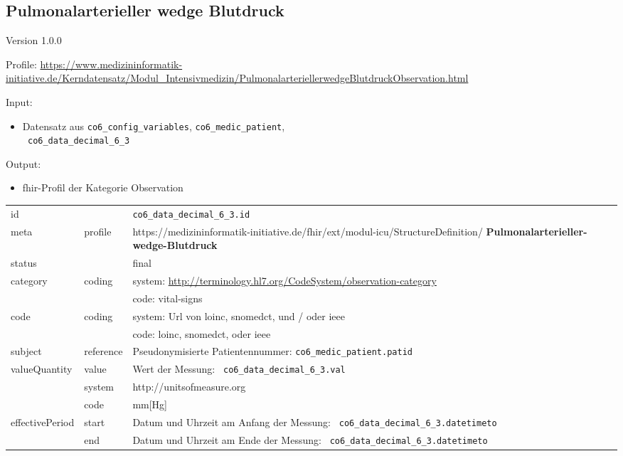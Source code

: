 \subsection{
Pulmonalarterieller wedge Blutdruck} 
\noindent Version 1.0.0

\noindent Profile: \url{https://www.medizininformatik-initiative.de/Kerndatensatz/Modul_Intensivmedizin/PulmonalarteriellerwedgeBlutdruckObservation.html}

\noindent Input:
\begin{itemize}
	\item Datensatz aus \texttt{co6\_config\_variables}, \texttt{co6\_medic\_patient}, \\ \texttt{
co6\_data\_decimal\_6\_3}
\end{itemize}
Output:
\begin{itemize}
        \item \ac{fhir}-Profil der Kategorie \glqq Observation\grqq{}
\end{itemize}
\begin{longtable}{|l|l|p{7.5cm}|}
        \hline
        \rowcolor{lightgray} \multicolumn{3}{|l|}{Data Mapping (inhaltlich)} \\ \hline
        id &  & \texttt{co6\_data\_decimal\_6\_3.id} \\ \hline
	meta & profile & https://medizininformatik-initiative.de/fhir/ext/modul-icu/StructureDefinition/\textbf{
Pulmonalarterieller-wedge-Blutdruck} \\ \hline 
	status &  & final  \\ \hline 
	category & coding & system: \url{http://terminology.hl7.org/CodeSystem/observation-category} \\
\cline{3-3}
	& & code: vital-signs\\ \hline
	code & coding & system: Url von \ac{loinc}, \ac{snomedct}, und / oder \ac{ieee} \\ 
	\cline{3-3} 
	 &  & code: \ac{loinc}, \ac{snomedct}, oder \ac{ieee} \\ \hline
	subject & reference & Pseudonymisierte Patientennummer: \texttt{co6\_medic\_patient.patid} \\ \hline
	valueQuantity & value & Wert der Messung: \texttt{
co6\_data\_decimal\_6\_3.val} \\
        \cline{2-3}
         & system & http://unitsofmeasure.org \\
         \cline{2-3}
         & code & mm[Hg] \\ \hline
    effectivePeriod & start & Datum und Uhrzeit am Anfang der Messung: \texttt{
co6\_data\_decimal\_6\_3.datetimeto} \\
    \cline{2-3}
     & end & Datum und Uhrzeit am Ende der Messung: \texttt{
co6\_data\_decimal\_6\_3.datetimeto} \\ \hline
\end{longtable}


